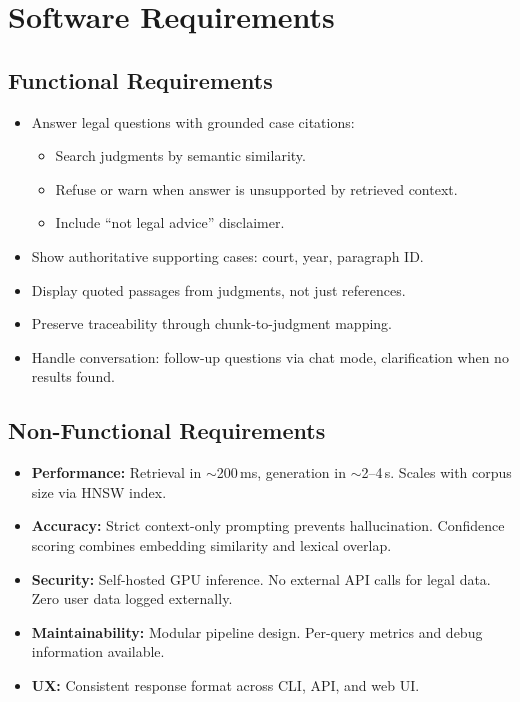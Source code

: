 \documentclass[11pt,a4paper]{article}
\begin{document}
\section{Software Requirements}

\subsection{Functional Requirements}

\begin{itemize}[noitemsep]
    \item Answer legal questions with grounded case citations:
        \begin{itemize}[noitemsep]
            \item Search judgments by semantic similarity.
            \item Refuse or warn when answer is unsupported by retrieved
                context.
            \item Include ``not legal advice'' disclaimer.
        \end{itemize}
    \item Show authoritative supporting cases: court, year, paragraph ID.
    \item Display quoted passages from judgments, not just references.
    \item Preserve traceability through chunk-to-judgment mapping.
    \item Handle conversation: follow-up questions via chat mode,
        clarification when no results found.
\end{itemize}

\subsection{Non-Functional Requirements}

\begin{itemize}[noitemsep]
    \item \textbf{Performance:} Retrieval in $\sim$200\,ms, generation in
        $\sim$2--4\,s. Scales with corpus size via HNSW index.
    \item \textbf{Accuracy:} Strict context-only prompting prevents
        hallucination. Confidence scoring combines embedding similarity
        and lexical overlap.
    \item \textbf{Security:} Self-hosted GPU inference. No external API
        calls for legal data. Zero user data logged externally.
    \item \textbf{Maintainability:} Modular pipeline design.
        Per-query metrics and debug information available.
    \item \textbf{UX:} Consistent response format across CLI, API, and
        web UI.
\end{itemize}
\end{document}
